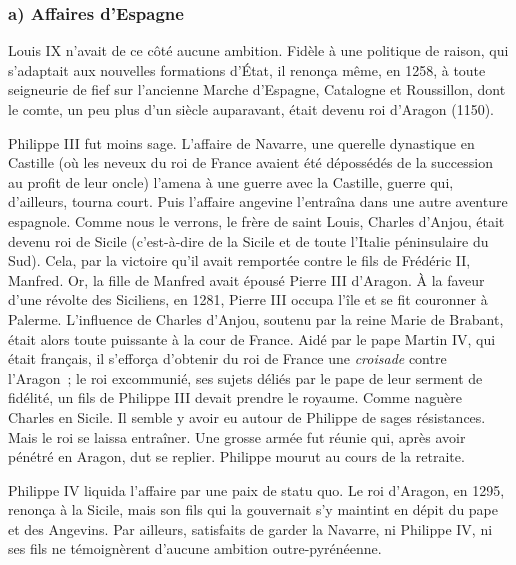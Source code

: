 \documentclass[french,twoside]{book} %
\begin{document}
\subsubsection[{a) Affaires d’Espagne}]{a) Affaires d’Espagne}
\noindent Louis IX n’avait de ce côté aucune ambition. Fidèle à une politique de raison, qui s’adaptait aux nouvelles formations d’État, il renonça même, en 1258, à toute seigneurie de fief sur l’ancienne Marche d’Espagne, Catalogne et Roussillon, dont le comte, un peu plus d’un siècle auparavant, était devenu roi d’Aragon (1150).\par
Philippe III fut moins sage. L’affaire de Navarre, une querelle dynastique en Castille (où les neveux du roi de France avaient été dépossédés de la succession au profit de leur oncle) l’amena à une guerre avec la Castille, guerre qui, d’ailleurs, tourna court. Puis l’affaire angevine l’entraîna dans une autre aventure espagnole. Comme nous le verrons, le frère de saint Louis, Charles d’Anjou, était devenu roi de Sicile (c’est-à-dire de la Sicile et de toute l’Italie péninsulaire du Sud). Cela, par la victoire qu’il avait remportée contre le fils de Frédéric II, Manfred. Or, la fille de Manfred avait épousé Pierre III d’Aragon. À la faveur d’une révolte des Siciliens, en 1281, Pierre III occupa l’île et se fit couronner à Palerme. L’influence de Charles d’Anjou, soutenu par la reine Marie de Brabant, était alors toute puissante à la cour de France. Aidé par le pape Martin IV, qui était français, il s’efforça d’obtenir du roi de France une \emph{croisade} contre l’Aragon ; le roi excommunié, ses sujets déliés par le pape de leur serment de fidélité, un fils de Philippe III devait prendre le royaume. Comme naguère Charles en Sicile. Il semble y avoir eu autour de Philippe de sages résistances. Mais le roi se laissa entraîner. Une grosse armée fut réunie qui, après avoir pénétré en Aragon, dut se replier. Philippe mourut au cours de la retraite.\par
Philippe IV liquida l’affaire par une paix de statu quo. Le roi d’Aragon, en 1295, renonça à la Sicile, mais son fils qui la gouvernait s’y maintint en dépit du pape et des Angevins. Par ailleurs, satisfaits de garder la Navarre, ni Philippe IV, ni ses fils ne témoignèrent d’aucune ambition outre-pyrénéenne.
\end{document}
